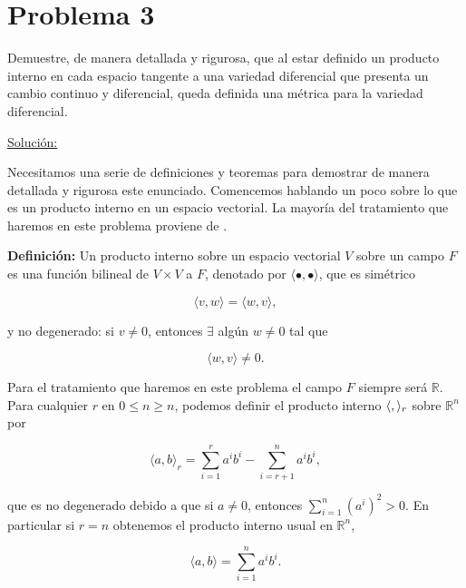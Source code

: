 \documentclass[a4paper,10pt]{article}
\numberwithin{equation}{section}
\newcommand{\definicion}{\textbf{Definición: }}
\begin{document}
\section{Problema 3}

Demuestre, de manera detallada y rigurosa, que al estar definido un producto interno 
en cada espacio tangente a una variedad diferencial que presenta un cambio continuo 
y diferencial, queda definida una métrica para la variedad diferencial.

\vspace{.3cm}

\underline{Solución:} \vspace{.3cm}

Necesitamos una serie de definiciones y teoremas para demostrar de manera detallada 
y rigurosa este enunciado. Comencemos hablando un poco sobre lo que es un producto 
interno en un espacio vectorial. La mayoría del tratamiento que haremos en este 
problema proviene de \cite{spivak}.

\vspace{.3cm}

\definicion Un producto interno sobre un espacio vectorial $V$ sobre un campo $F$ es 
una función bilineal de $V \times V$ a $F$, denotado por $\langle \bullet, \bullet \rangle$, que 
es simétrico

\begin{equation}
 \langle v, w \rangle = \langle w, v \rangle,
\end{equation}

y no degenerado: si $v\ne 0$, entonces $\exists$ algún $w \ne 0$ tal que

\begin{equation}
 \langle w, v \rangle \ne 0.
\end{equation}

Para el tratamiento que haremos en este problema el campo $F$ siempre será $\mathbb{R}$. Para 
cualquier $r$ en $0 \leq n \geq n$, podemos definir el producto interno 
$\langle \space , \space \rangle_r$ sobre $\mathbb{R}^n$ por 

\begin{equation}
 \langle a, b \rangle_r = \sum_{i=1}^r a^ib^i - \sum_{i=r+1}^n a^ib^i,
\end{equation}

que es no degenerado debido a que si $a \ne 0$, entonces $\sum_{i=1}^n (a^i)^2 > 0$. 
En particular si $r = n$ obtenemos el producto interno usual en $\mathbb{R}^n$,

\begin{equation}
 \langle a, b \rangle = \sum_{i=1}^n a^ib^i.
\end{equation}
\end{document}
